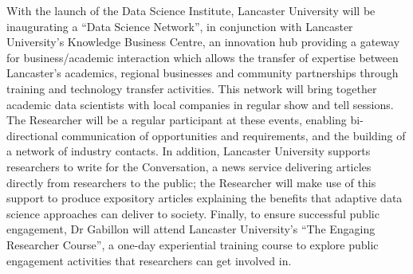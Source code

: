\documentclass[a4paper,11pt]{article}
\newcommand{\TODO}[1]{{\textcolor{red}{[\textbf{TODO:} #1]}}}
\begin{document}
%

With the launch of the Data Science Institute, Lancaster University will be inaugurating a ``Data Science Network'', in conjunction with Lancaster University's Knowledge Business Centre, an innovation hub providing a gateway for business/academic interaction which allows the transfer of expertise between Lancaster's academics, regional businesses and community partnerships through training and technology transfer activities.  This network will bring together academic data scientists with local companies in regular show and tell sessions.  The Researcher will be a regular participant at these events, enabling bi-directional communication of opportunities and requirements, and the building of a network of industry contacts.
In addition, Lancaster University supports researchers to write for the Conversation, a news  service delivering articles directly from researchers to the public; the Researcher will make use of this support to produce expository articles explaining the benefits that adaptive data science approaches can deliver to society.
Finally, to ensure successful public engagement, Dr Gabillon will attend Lancaster University's ``The Engaging Researcher Course'', a one-day experiential training course to explore public engagement activities that researchers can get involved in.
\end{document}
